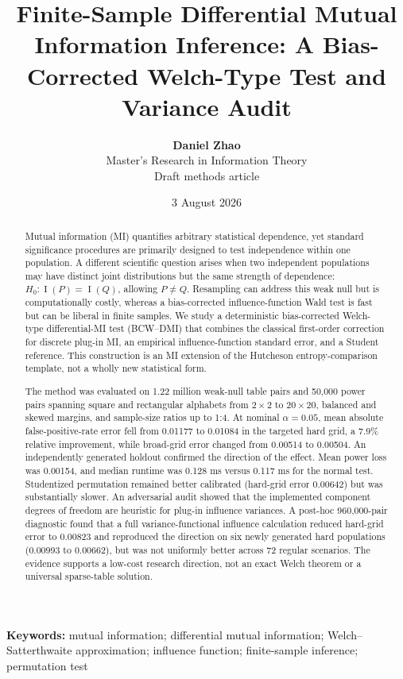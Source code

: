 \documentclass[10pt,twocolumn]{article}
\title{\vspace{-1.2em}\textbf{Finite-Sample Differential Mutual Information
Inference: A Bias-Corrected Welch-Type Test and Variance Audit}}
\author{\textbf{Daniel Zhao}\\
\small Master's Research in Information Theory\\
\small Draft methods article}
\date{\small 3 August 2026}
\newcommand{\MI}{\operatorname{I}}
\newcommand{\method}{BCW--DMI}
\begin{document}
\maketitle

\begin{abstract}
Mutual information (MI) quantifies arbitrary statistical dependence, yet
standard significance procedures are primarily designed to test independence
within one population. A different scientific question arises when two
independent populations may have distinct joint distributions but the same
strength of dependence: \(H_0:\MI(P)=\MI(Q)\), allowing \(P\ne Q\). Resampling
can address this weak null but is computationally costly, whereas a
bias-corrected influence-function Wald test is fast but can be liberal in
finite samples. We study a deterministic bias-corrected Welch-type
differential-MI test (\method) that combines the classical first-order
correction for discrete plug-in MI, an empirical influence-function standard
error, and a Student reference. This construction is an MI extension of the
Hutcheson entropy-comparison template, not a wholly new statistical form.

The method was evaluated on 1.22 million weak-null table pairs and 50,000
power pairs spanning square and rectangular alphabets from \(2\times2\) to
\(20\times20\), balanced and skewed margins, and sample-size ratios up to
1:4. At nominal \(\alpha=0.05\), mean absolute false-positive-rate error fell
from 0.01177 to 0.01084 in the targeted hard grid, a 7.9\% relative
improvement, while broad-grid error changed from 0.00514 to 0.00504.
An independently generated holdout confirmed the direction of the effect.
Mean power loss was 0.00154, and median runtime was 0.128 ms versus 0.117 ms
for the normal test. Studentized permutation remained better calibrated
(hard-grid error 0.00642) but was substantially slower. An adversarial audit
showed that the implemented component degrees of freedom are heuristic for
plug-in influence variances. A post-hoc 960,000-pair diagnostic found that a
full variance-functional influence calculation reduced hard-grid error to
0.00823 and reproduced the direction on six newly generated hard populations
(0.00993 to 0.00662), but was not uniformly better across 72 regular
scenarios. The evidence supports a low-cost research direction, not an exact
Welch theorem or a universal sparse-table solution.
\end{abstract}

\noindent\textbf{Keywords:} mutual information; differential mutual
information; Welch--Satterthwaite approximation; influence function;
finite-sample inference; permutation test
\end{document}
